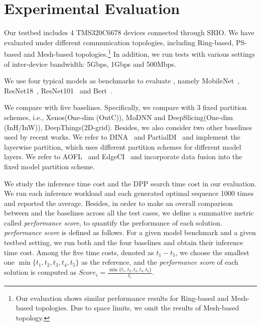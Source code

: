 \section{Experimental Evaluation}
\label{sec-exp}
 Our testbed includes 4 TMS320C6678\cite{tms} devices connected through SRIO. We have evaluated under different communication topologies, including Ring-based, PS-based and Mesh-based topologies.\footnote{Our evaluation shows similar performance results for Ring-based and Mesh-based topologies. Due to space limits, we omit the results of Mesh-based topology.} In addition, we run tests with various settings of inter-device bandwidth: 5Gbps, 1Gbps and 500Mbps.

We use four typical models as benchmarks to evaluate \sysname, namely MobileNet~\cite{howard2017mobilenets}, ResNet18~\cite{he2016deep}, ResNet101~\cite{he2016deep} and Bert~\cite{jawahar2019does}.

 We compare \sysname with five baselines. Specifically, we compare \sysname with 3 fixed partition schemes, i.e., Xenos\cite{zhang2023xenos}(One-dim (OutC)), MoDNN\cite{mao2017modnn} and DeepSlicing\cite{zhang2021deepslicing}(One-dim (InH/InW)), DeepThings\cite{zhao2018deepthings}(2D-grid). Besides, we also consider two other baselines used by recent works. We refer to DINA~\cite{mohammed2020distributed} and PartialDI~\cite{dey2019embedded} and implement the layerwise partition, which uses different partition schemes for different model layers. We refer to AOFL~\cite{zhou2019adaptive} and EdgeCI~\cite{chen2024edgeci} and incorporate data fusion into the fixed model partition scheme. 




 We study the inference time cost and the DPP search time cost in our evaluation. We run each inference workload and each generated optimal sequence 1000 times and reported the average. Besides, in order to make an overall comparison between \sysname and the baselines across all the test cases, we define a summative metric called \emph{performance score}, to quantify the performance of each solution. \emph{performance score} is defined as follows. For a given model benchmark and a given testbed setting, we run both \sysname and the four baselines and obtain their inference time cost. Among the five time costs, denoted as $t_1-t_5$, we choose the smallest one $\min\{t_1,t_2,t_3,t_4,t_5\}$ as the reference, and the \emph{performance score} of each solution is computed as 
$Score_{i}=\frac{{\min\{t_1,t_2,t_3,t_4,t_5\}}}{t_i}$.

